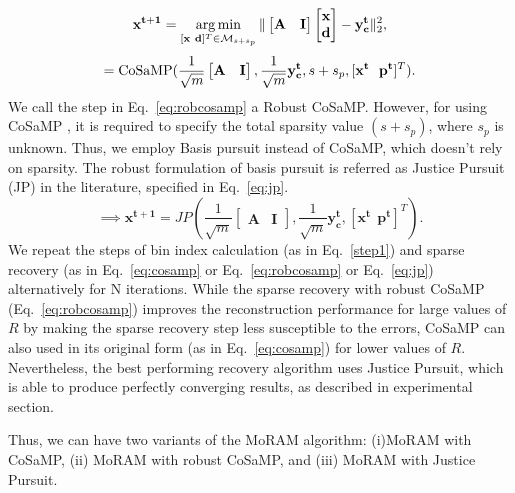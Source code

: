 $$
\mathbf{{x}^{t+1}}=\argmin_{[\mathbf{x~d}]^T \in \mathcal{M}_{s+s_p}}\norm{\begin{bmatrix} \mathbf{A} & \mathbf{I} \end{bmatrix} \begin{bmatrix} \mathbf{x} \\ \mathbf{d} \end{bmatrix} - \mathbf{y^t_c}}_2^2, %
$$
\begin{equation}
= \cosamp(\frac{1}{\sqrt{m}}\begin{bmatrix} \mathbf{A} & \mathbf{I} \end{bmatrix},\frac{1}{\sqrt{m}}\mathbf{y_c^t},s+s_p,[\mathbf{x^t~~p^t}]^T).
\label{eq:robcosamp}
\end{equation}
We call the step in Eq.~\ref{eq:robcosamp} a Robust CoSaMP. 
However, for using CoSaMP , it is required to specify the total sparsity value $(s +s_p)$, where $s_p$ is unknown. Thus, we employ Basis pursuit instead of CoSaMP, which doesn't rely on sparsity. The robust formulation of basis pursuit is referred as Justice Pursuit (JP) in the literature, specified in Eq.~\ref{eq:jp}.
\begin{equation}
\implies \mathbf{{x^{t+1}}} = JP(\frac{1}{\sqrt{m}}\begin{bmatrix} \mathbf{A} & \mathbf{I} \end{bmatrix},\frac{1}{\sqrt{m}}\mathbf{y^t_c},[\mathbf{x^t~~p^t}]^T).
\label{eq:jp}
\end{equation}
We repeat the steps of bin index calculation (as in Eq.~\ref{step1}) and sparse recovery (as in Eq.~\ref{eq:cosamp} or Eq.~\ref{eq:robcosamp} or Eq.~\ref{eq:jp}) alternatively for $\mathrm{N}$ iterations. While the sparse recovery with robust CoSaMP (Eq.~\ref{eq:robcosamp}) improves the reconstruction performance for large values of $R$ by making the sparse recovery step less susceptible to the errors, CoSaMP can also used in its original form (as in Eq.~\ref{eq:cosamp}) for lower values of $R$. Nevertheless, the best performing recovery algorithm uses Justice Pursuit, which is able to produce perfectly converging results, as described in experimental section.

Thus, we can have two variants of the MoRAM algorithm: (i)MoRAM with CoSaMP, (ii) MoRAM with robust CoSaMP, and (iii) MoRAM with Justice Pursuit. 


%
